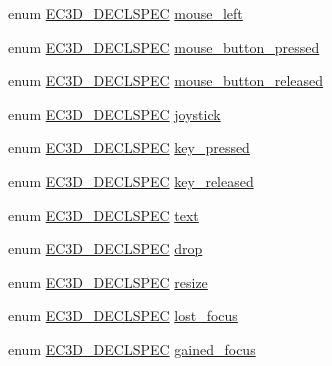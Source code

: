 \begin{DoxyCompactItemize}
\item 
enum \mbox{\hyperlink{_common_8h_aac42573e202ca3dd4d259c81691e2369}{E\+C3\+D\+\_\+\+D\+E\+C\+L\+S\+P\+EC}} \mbox{\hyperlink{namespaceec_a5fd84b2204156e6d2e500dfd83ea2b4b}{mouse\+\_\+left}}
\item 
enum \mbox{\hyperlink{_common_8h_aac42573e202ca3dd4d259c81691e2369}{E\+C3\+D\+\_\+\+D\+E\+C\+L\+S\+P\+EC}} \mbox{\hyperlink{namespaceec_a4b2a6409d34d7e07233d26b19bf3540c}{mouse\+\_\+button\+\_\+pressed}}
\item 
enum \mbox{\hyperlink{_common_8h_aac42573e202ca3dd4d259c81691e2369}{E\+C3\+D\+\_\+\+D\+E\+C\+L\+S\+P\+EC}} \mbox{\hyperlink{namespaceec_af6e3c23e9650c9ecfd41cfd817f1a068}{mouse\+\_\+button\+\_\+released}}
\item 
enum \mbox{\hyperlink{_common_8h_aac42573e202ca3dd4d259c81691e2369}{E\+C3\+D\+\_\+\+D\+E\+C\+L\+S\+P\+EC}} \mbox{\hyperlink{namespaceec_a48a4c5a1e957c8419028491291e37634}{joystick}}
\item 
enum \mbox{\hyperlink{_common_8h_aac42573e202ca3dd4d259c81691e2369}{E\+C3\+D\+\_\+\+D\+E\+C\+L\+S\+P\+EC}} \mbox{\hyperlink{namespaceec_a6db9eda8a1039ccbbc883b1156c6c838}{key\+\_\+pressed}}
\item 
enum \mbox{\hyperlink{_common_8h_aac42573e202ca3dd4d259c81691e2369}{E\+C3\+D\+\_\+\+D\+E\+C\+L\+S\+P\+EC}} \mbox{\hyperlink{namespaceec_a8ec308d52dd60f3bc270fc07a113bd67}{key\+\_\+released}}
\item 
enum \mbox{\hyperlink{_common_8h_aac42573e202ca3dd4d259c81691e2369}{E\+C3\+D\+\_\+\+D\+E\+C\+L\+S\+P\+EC}} \mbox{\hyperlink{namespaceec_a0bdee24285d69deca899e166b29c0150}{text}}
\item 
enum \mbox{\hyperlink{_common_8h_aac42573e202ca3dd4d259c81691e2369}{E\+C3\+D\+\_\+\+D\+E\+C\+L\+S\+P\+EC}} \mbox{\hyperlink{namespaceec_ac1c8382601881db68a89d49d959b3fb8}{drop}}
\item 
enum \mbox{\hyperlink{_common_8h_aac42573e202ca3dd4d259c81691e2369}{E\+C3\+D\+\_\+\+D\+E\+C\+L\+S\+P\+EC}} \mbox{\hyperlink{namespaceec_a84e452d7f020435b50e2c18e7cdca968}{resize}}
\item 
enum \mbox{\hyperlink{_common_8h_aac42573e202ca3dd4d259c81691e2369}{E\+C3\+D\+\_\+\+D\+E\+C\+L\+S\+P\+EC}} \mbox{\hyperlink{namespaceec_af038c649a7c43904c7d37ba129f1b346}{lost\+\_\+focus}}
\item 
enum \mbox{\hyperlink{_common_8h_aac42573e202ca3dd4d259c81691e2369}{E\+C3\+D\+\_\+\+D\+E\+C\+L\+S\+P\+EC}} \mbox{\hyperlink{namespaceec_a1e2dd185f2ea6b2729b32fec30917a0e}{gained\+\_\+focus}}
\item 

\end{DoxyCompactItemize}
